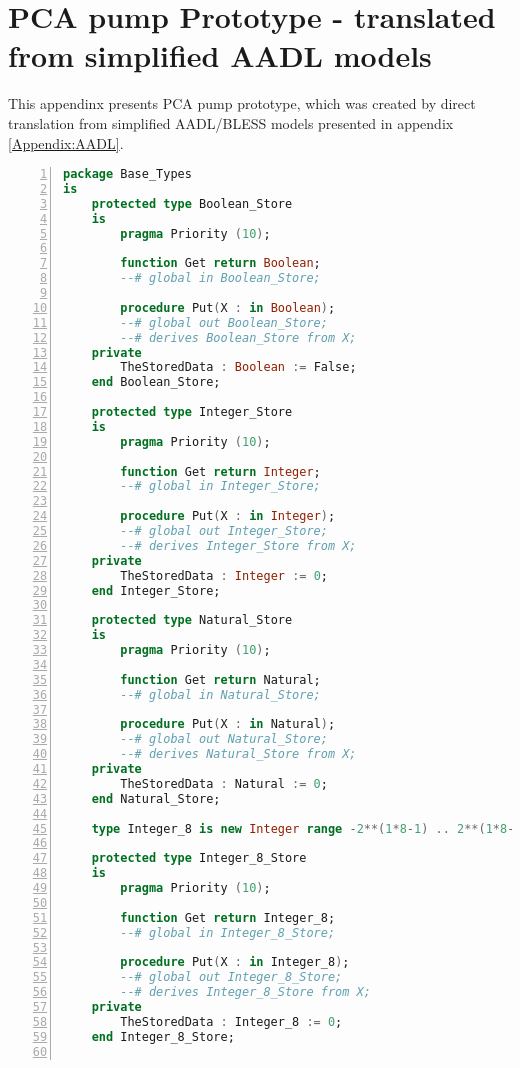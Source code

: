 
\cleardoublepage

\chapter{PCA pump Prototype - translated from simplified AADL models}
\label{Appendix:pca_generated}

This appendinx presents PCA pump prototype, which was created by direct translation from simplified AADL/BLESS models presented in appendix \ref{Appendix:AADL}.

\singlespacing
\begin{lstlisting}[language=ada, gobble=0, numbers=left, caption={\lstinline{Base_Types} package}]
package Base_Types
is
    protected type Boolean_Store
    is
        pragma Priority (10);

        function Get return Boolean;
        --# global in Boolean_Store;

        procedure Put(X : in Boolean);
        --# global out Boolean_Store;
        --# derives Boolean_Store from X;
    private
        TheStoredData : Boolean := False;
    end Boolean_Store;

    protected type Integer_Store
    is
        pragma Priority (10);

        function Get return Integer;
        --# global in Integer_Store;

        procedure Put(X : in Integer);
        --# global out Integer_Store;
        --# derives Integer_Store from X;
    private
        TheStoredData : Integer := 0;
    end Integer_Store;

    protected type Natural_Store
    is
        pragma Priority (10);

        function Get return Natural;
        --# global in Natural_Store;

        procedure Put(X : in Natural);
        --# global out Natural_Store;
        --# derives Natural_Store from X;
    private
        TheStoredData : Natural := 0;
    end Natural_Store;

    type Integer_8 is new Integer range -2**(1*8-1) .. 2**(1*8-1)-1;

    protected type Integer_8_Store
    is
        pragma Priority (10);

        function Get return Integer_8;
        --# global in Integer_8_Store;

        procedure Put(X : in Integer_8);
        --# global out Integer_8_Store;
        --# derives Integer_8_Store from X;
    private
        TheStoredData : Integer_8 := 0;
    end Integer_8_Store;


\end{lstlisting}
